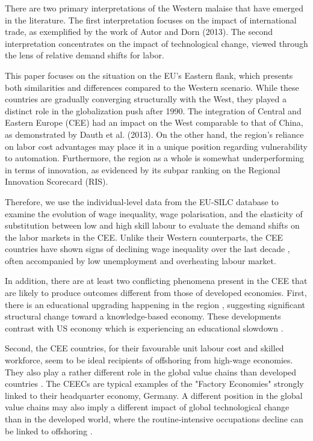 \documentclass[11pt]{article}
\begin{document}
There are two primary interpretations of the Western malaise that have emerged in the literature. The first interpretation focuses on the impact of international trade, as exemplified by the work of Autor and Dorn (2013). The second interpretation concentrates on the impact of technological change, viewed through the lens of relative demand shifts for labor. 

This paper focuses on the situation on the EU's Eastern flank, which presents both similarities and differences compared to the Western scenario. While these countries are gradually converging structurally with the West, they played a distinct role in the globalization push after 1990. The integration of Central and Eastern Europe (CEE) had an impact on the West comparable to that of China, as demonstrated by Dauth et al. (2013). On the other hand, the region's reliance on labor cost advantages may place it in a unique position regarding vulnerability to automation. Furthermore, the region as a whole is somewhat underperforming in terms of innovation, as evidenced by its subpar ranking on the Regional Innovation Scorecard (RIS).


Therefore, we use the individual-level data from the EU-SILC database to examine the evolution of wage inequality, wage polarisation, and the elasticity of substitution between low and high skill labour to evaluate the demand shifts on the labor markets in the CEE. Unlike their Western counterparts, the CEE countries have shown signs of declining wage inequality over the last decade \citep{magda2021firms}, often accompanied by low unemployment and overheating labour market.

In addition, there are at least two conflicting phenomena present in the CEE that are likely to produce outcomes different from those of developed economies. First, there is an educational upgrading happening in the region \citep{hardy2018educational}, suggesting significant structural change toward a knowledge-based economy. These developments contrast with US economy which is experiencing an educational slowdown \citep{goldin2010race}.

Second, the CEE countries, for their favourable unit labour cost and skilled workforce, seem to be ideal recipients of offshoring from high-wage economies. They also play a rather different role in the global value chains than developed countries \citep{baldwin2015supply}. The CEECs are typical examples of the "Factory Economies" strongly linked to their headquarter economy, Germany. 
A different position in the global value chains may also imply a different impact of global technological change than in the developed world, where the routine-intensive occupations decline can be linked to offshoring \citep{acemoglu2012does}.
\end{document}
